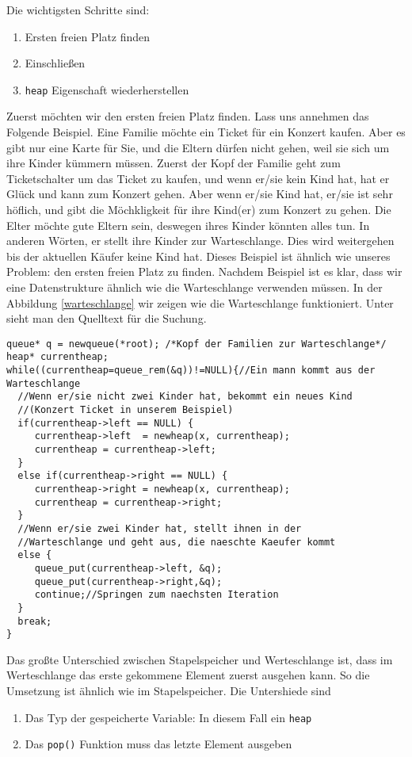 Die wichtigsten Schritte sind:
\begin{enumerate}
\item Ersten freien Platz finden
\item Einschließen
\item \texttt{heap} Eigenschaft wiederherstellen
\end{enumerate}
Zuerst möchten wir den ersten freien Platz finden. Lass uns annehmen
das Folgende Beispiel. Eine Familie möchte ein Ticket für ein Konzert kaufen.
Aber es gibt nur eine Karte für Sie, und die Eltern dürfen nicht gehen, weil sie sich 
um ihre Kinder kümmern müssen. Zuerst der Kopf der Familie geht zum Ticketschalter
um das Ticket zu kaufen, und wenn er/sie  kein Kind hat, hat er Glück und
kann zum Konzert gehen. Aber wenn er/sie Kind hat, er/sie ist sehr höflich, und 
gibt die Möchkligkeit für ihre Kind(er) zum Konzert zu gehen. Die Elter möchte 
gute Eltern sein, deswegen ihres Kinder könnten alles tun. In anderen Wörten, er
stellt ihre Kinder zur Warteschlange. Dies wird weitergehen bis der aktuellen Käufer 
keine Kind hat. Dieses Beispiel ist ähnlich wie unseres Problem: den ersten freien 
Platz zu finden. Nachdem Beispiel ist es klar, dass wir eine Datenstrukture ähnlich wie 
die Warteschlange verwenden müssen. In der Abbildung \ref{warteschlange} wir zeigen wie 
die Warteschlange funktioniert. Unter sieht man den Quelltext für die Suchung.


\begin{lstlisting}
queue* q = newqueue(*root); /*Kopf der Familien zur Warteschlange*/
heap* currentheap; 
while((currentheap=queue_rem(&q))!=NULL){//Ein mann kommt aus der Warteschlange
  //Wenn er/sie nicht zwei Kinder hat, bekommt ein neues Kind
  //(Konzert Ticket in unserem Beispiel)
  if(currentheap->left == NULL) {
     currentheap->left  = newheap(x, currentheap);
     currentheap = currentheap->left;
  }
  else if(currentheap->right == NULL) {
     currentheap->right = newheap(x, currentheap);
     currentheap = currentheap->right;
  }
  //Wenn er/sie zwei Kinder hat, stellt ihnen in der 
  //Warteschlange und geht aus, die naeschte Kaeufer kommt
  else {
     queue_put(currentheap->left, &q);
     queue_put(currentheap->right,&q);
     continue;//Springen zum naechsten Iteration
  }
  break;
}
\end{lstlisting}


Das großte Unterschied zwischen Stapelspeicher und 
Werteschlange ist, dass im Werteschlange das erste gekommene Element zuerst ausgehen kann. 
So die Umsetzung ist ähnlich wie im Stapelspeicher. Die Untershiede sind
\begin{enumerate}
\item Das Typ der gespeicherte Variable: In diesem Fall ein \texttt{heap}
\item Das \texttt{pop()} Funktion muss das letzte Element ausgeben
\end{enumerate}

